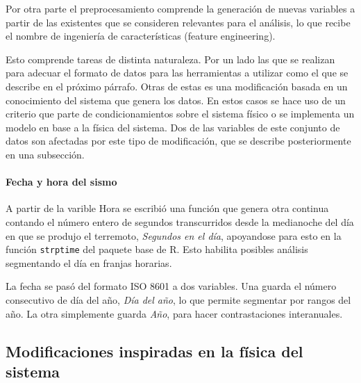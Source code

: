 \documentclass[a4paper]{report}
\begin{document}
Por otra parte el preprocesamiento comprende la generación de nuevas variables a partir de las existentes que se consideren relevantes para el análisis, lo que recibe el nombre de ingeniería de características (feature engineering).

Esto comprende tareas de distinta naturaleza.
Por un lado las que se realizan para adecuar el formato de datos para las herramientas a utilizar como el que se describe en el próximo párrafo.
Otras de estas es una modificación basada en un conocimiento del sistema que genera los datos.
En estos casos se hace uso de un criterio que parte de condicionamientos sobre el sistema físico o se implementa un modelo en base a la física del sistema.
Dos de las variables de este conjunto de datos son afectadas por este tipo de modificación, que se describe posteriormente en una subsección.



\paragraph{Fecha y hora del sismo}
A partir de la varible Hora se escribió una función que genera otra continua contando el número entero de segundos transcurridos desde la medianoche del día en que se produjo el terremoto, \emph{Segundos en el día}, apoyandose para esto en la función \verb'strptime' del paquete base de R.
Esto habilita posibles análisis segmentando el día en franjas horarias.

La fecha se pasó del formato ISO 8601 a dos variables.
Una guarda el número consecutivo de día del año, \emph{Día del año}, lo que permite segmentar por rangos del año.
La otra simplemente guarda \emph{Año}, para hacer contrastaciones interanuales.


\subsection{Modificaciones inspiradas en la física del sistema}
\end{document}
